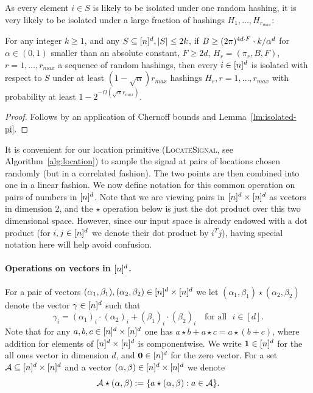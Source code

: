 As every element $i\in S$ is likely to be isolated under one random hashing, it is very likely to be isolated under a large fraction of hashings $H_1,\ldots, H_{r_{max}}$:
\begin{lemma}\label{lm:good-prob}
For any integer $k\geq 1$, and any $S\subseteq {[n]^d}, |S|\leq 2k$, if $B\geq (2\pi)^{4d\cdot F}\cdot k/\alpha^d$ for $\alpha\in (0, 1)$ smaller than an absolute constant, $F\geq 2d$, $H_r=(\pi_r, B, F)$, $r=1,\ldots, r_{max}$ a sequence of random hashings, then every $i\in {[n]^d}$ is isolated with respect to $S$ under at least $(1-\sqrt{\alpha})r_{max}$ hashings $H_r, r=1,\ldots, r_{max}$ with probability at least $1-2^{-\Omega(\sqrt{\alpha}r_{max})}$.
\end{lemma}
\begin{proof}
Follows by an application of Chernoff bounds and Lemma~\ref{lm:isolated-pi}.
\end{proof}

It is convenient for our location primitive (\textsc{LocateSignal}, see Algorithm~\ref{alg:location}) to sample the signal at pairs of locations chosen randomly (but in a correlated fashion). The two points are then combined into one in a linear fashion. We now define notation for this common operation on pairs of numbers in ${[n]^d}$. Note that we are viewing pairs in ${[n]^d}\times {[n]^d}$ as vectors in dimension $2$, and the $\star$ operation below is just the dot product over this two dimensional space. However, since our input space is already endowed with a dot product (for $i, j\in {[n]^d}$ we denote their dot product by $i^Tj$), having special notation here will help avoid confusion.
\paragraph{Operations on vectors in ${[n]^d}$.} For a pair of vectors $(\alpha_1, \beta_1), (\alpha_2, \beta_2)\in {[n]^d}\times {[n]^d}$ we let $(\alpha_1, \beta_1)\star (\alpha_2, \beta_2)$ denote the vector $\gamma\in {[n]^d}$ such that 
$$
\gamma_i=(\alpha_1)_i\cdot (\alpha_2)_i+(\beta_1)_i\cdot (\beta_2)_i\text{~~~for all ~}i\in [d].
$$
Note that for any $a, b, c\in {[n]^d}\times {[n]^d}$ one has $a\star b+a\star c=a\star (b+c)$, where addition for elements of ${[n]^d}\times {[n]^d}$ is componentwise.
We write $\mathbf{1}\in {[n]^d}$ for the all ones vector in dimension $d$, and $\mathbf{0}\in {[n]^d}$ for the zero vector. For a set ${\mathcal{A}}\subseteq {[n]^d}\times {[n]^d}$ and a vector $(\alpha, \beta)\in {[n]^d}\times {[n]^d}$ we denote
$$
{\mathcal{A}}\star (\alpha, \beta):=\{a\star(\alpha, \beta): a\in {\mathcal{A}}\}.
$$


